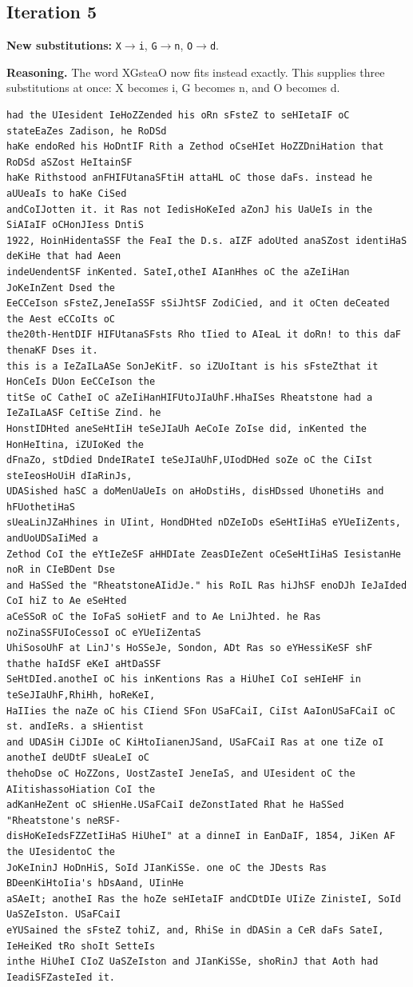 \documentclass[12pt,a4paper]{article}
\begin{document}
\subsection{Iteration 5}

\noindent\textbf{New substitutions:} \texttt{X}$\rightarrow$\texttt{i}, \texttt{G}$\rightarrow$\texttt{n}, \texttt{O}$\rightarrow$\texttt{d}.\par
\smallskip
\noindent\textbf{Reasoning.} The word XGsteaO now fits instead exactly. This supplies three substitutions at once: X becomes i, G becomes n, and O becomes d.

\begin{lstlisting}[style=ciphertext,caption={Complete text after iteration 5}]
had the UIesident IeHoZZended his oRn sFsteZ to seHIetaIF oC stateEaZes Zadison, he RoDSd
haKe endoRed his HoDntIF Rith a Zethod oCseHIet HoZZDniHation that RoDSd aSZost HeItainSF
haKe Rithstood anFHIFUtanaSFtiH attaHL oC those daFs. instead he aUUeaIs to haKe CiSed
andCoIJotten it. it Ras not IedisHoKeIed aZonJ his UaUeIs in the SiAIaIF oCHonJIess DntiS
1922, HoinHidentaSSF the FeaI the D.s. aIZF adoUted anaSZost identiHaS deKiHe that had Aeen
indeUendentSF inKented. SateI,otheI AIanHhes oC the aZeIiHan JoKeInZent Dsed the
EeCCeIson sFsteZ,JeneIaSSF sSiJhtSF ZodiCied, and it oCten deCeated the Aest eCCoIts oC
the20th-HentDIF HIFUtanaSFsts Rho tIied to AIeaL it doRn! to this daF thenaKF Dses it.
this is a IeZaILaASe SonJeKitF. so iZUoItant is his sFsteZthat it HonCeIs DUon EeCCeIson the
titSe oC CatheI oC aZeIiHanHIFUtoJIaUhF.HhaISes Rheatstone had a IeZaILaASF CeItiSe Zind. he
HonstIDHted aneSeHtIiH teSeJIaUh AeCoIe ZoIse did, inKented the HonHeItina, iZUIoKed the
dFnaZo, stDdied DndeIRateI teSeJIaUhF,UIodDHed soZe oC the CiIst steIeosHoUiH dIaRinJs,
UDASished haSC a doMenUaUeIs on aHoDstiHs, disHDssed UhonetiHs and hFUothetiHaS
sUeaLinJZaHhines in UIint, HondDHted nDZeIoDs eSeHtIiHaS eYUeIiZents, andUoUDSaIiMed a
Zethod CoI the eYtIeZeSF aHHDIate ZeasDIeZent oCeSeHtIiHaS IesistanHe noR in CIeBDent Dse
and HaSSed the "RheatstoneAIidJe." his RoIL Ras hiJhSF enoDJh IeJaIded CoI hiZ to Ae eSeHted
aCeSSoR oC the IoFaS soHietF and to Ae LniJhted. he Ras noZinaSSFUIoCessoI oC eYUeIiZentaS
UhiSosoUhF at LinJ's HoSSeJe, Sondon, ADt Ras so eYHessiKeSF shF thathe haIdSF eKeI aHtDaSSF
SeHtDIed.anotheI oC his inKentions Ras a HiUheI CoI seHIeHF in teSeJIaUhF,RhiHh, hoReKeI,
HaIIies the naZe oC his CIiend SFon USaFCaiI, CiIst AaIonUSaFCaiI oC st. andIeRs. a sHientist
and UDASiH CiJDIe oC KiHtoIianenJSand, USaFCaiI Ras at one tiZe oI anotheI deUDtF sUeaLeI oC
thehoDse oC HoZZons, UostZasteI JeneIaS, and UIesident oC the AIitishassoHiation CoI the
adKanHeZent oC sHienHe.USaFCaiI deZonstIated Rhat he HaSSed "Rheatstone's neRSF-
disHoKeIedsFZZetIiHaS HiUheI" at a dinneI in EanDaIF, 1854, JiKen AF the UIesidentoC the
JoKeIninJ HoDnHiS, SoId JIanKiSSe. one oC the JDests Ras BDeenKiHtoIia's hDsAand, UIinHe
aSAeIt; anotheI Ras the hoZe seHIetaIF andCDtDIe UIiZe ZinisteI, SoId UaSZeIston. USaFCaiI
eYUSained the sFsteZ tohiZ, and, RhiSe in dDASin a CeR daFs SateI, IeHeiKed tRo shoIt SetteIs
inthe HiUheI CIoZ UaSZeIston and JIanKiSSe, shoRinJ that Aoth had IeadiSFZasteIed it.
\end{lstlisting}
\end{document}

